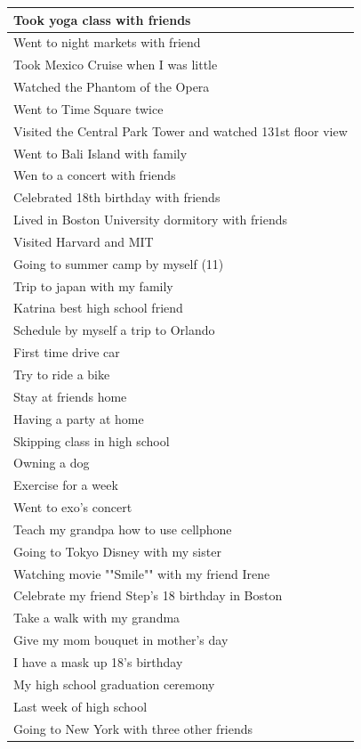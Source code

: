 \documentclass[
  .7em,
  letterpaper,
  DIV=11,
  numbers=noendperiod]{scrartcl}
\begin{document}
\begin{table}
\begin{tabular}{l}
\hline
Took yoga class with friends\\
\hline
Went to night markets with friend\\
\hline
Took Mexico Cruise when I was little\\
\hline
Watched the Phantom of the Opera\\
\hline
Went to Time Square twice\\
\hline
Visited the Central Park Tower and watched 131st floor view\\
\hline
Went to Bali Island with family\\
\hline
Wen to a concert with friends\\
\hline
Celebrated 18th birthday with friends\\
\hline
Lived in Boston University dormitory with friends\\
\hline
Visited Harvard and MIT\\
\hline
Going to summer camp by myself (11)\\
\hline
Trip to japan with my family\\
\hline
Katrina best high school friend\\
\hline
Schedule by myself a trip to Orlando\\
\hline
First time drive car\\
\hline
Try to ride a bike\\
\hline
Stay at friends home\\
\hline
Having a party at home\\
\hline
Skipping class in high school\\
\hline
Owning a dog\\
\hline
Exercise for a week\\
\hline
Went to exo's concert\\
\hline
Teach my grandpa how to use cellphone\\
\hline
Going to Tokyo Disney with my sister\\
\hline
Watching movie ""Smile"" with my friend Irene\\
\hline
Celebrate my friend Step's 18 birthday in Boston\\
\hline
Take a walk with my grandma\\
\hline
Give my mom bouquet in mother's day\\
\hline
I have a mask up 18's birthday\\
\hline
My high school graduation ceremony\\
\hline
Last week of high school\\
\hline
Going to New York with three other friends\\

\end{tabular}
\end{table}
\end{document}
